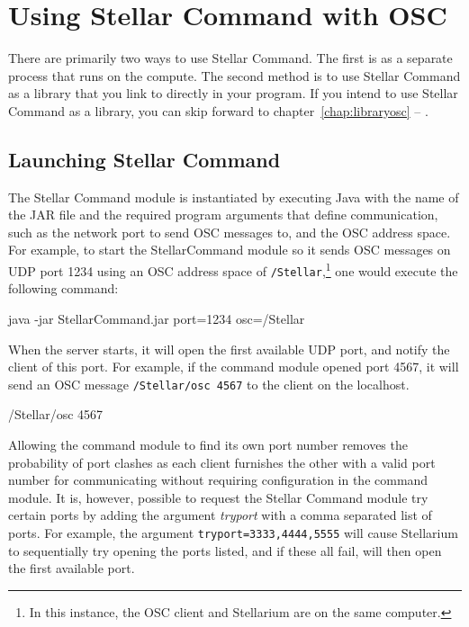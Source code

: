 \documentclass[10pt,a4paper,extrafontsizes]{memoir}
\begin{document}


\chapter{Using Stellar Command with OSC} \label{chap:launchosc}
There are primarily two ways to use Stellar Command. The first is as a separate process that runs on the compute. The second method is to use Stellar Command as a library that you link to directly in your program. If you intend to use Stellar Command as a library, you can skip forward to chapter~\ref{chap:libraryosc} --
\emph{}.


\section{Launching Stellar Command}
The Stellar Command module is instantiated by executing Java  with the name of the JAR file and the required program arguments that define communication, such as the network port to send OSC messages to, and the OSC address space.  For example, to start the StellarCommand module so it sends OSC messages on UDP port 1234  using an OSC address space of \texttt{/Stellar},\footnote{In this instance, the OSC client and Stellarium are on the same computer.} one would execute the following command:\\

\begin{syntax}
	\medskip
	java -jar StellarCommand.jar port=1234 osc=/Stellar  \\
	\medskip
\end{syntax}
\bigskip
   When the server starts, it will open the first available UDP port, and notify the client of this port. For example, if the command module opened port 4567, it will send an OSC message \texttt{/Stellar/osc 4567} to the client on the localhost. 
   
\begin{syntax}
	\medskip
	/Stellar/osc 4567  \\
	\medskip
\end{syntax}
\bigskip

Allowing the command module to find its own port number removes the probability of port clashes as each client furnishes the other with a valid port number for communicating without requiring configuration in the command module. It is, however, possible to request the Stellar Command module try certain ports by adding the argument \textit{tryport}  with a comma separated list of ports. For example, the argument \texttt{tryport=3333,4444,5555} will cause Stellarium to sequentially try opening the ports listed, and if these all fail, will then open the first available port.\\
   
\end{document}
